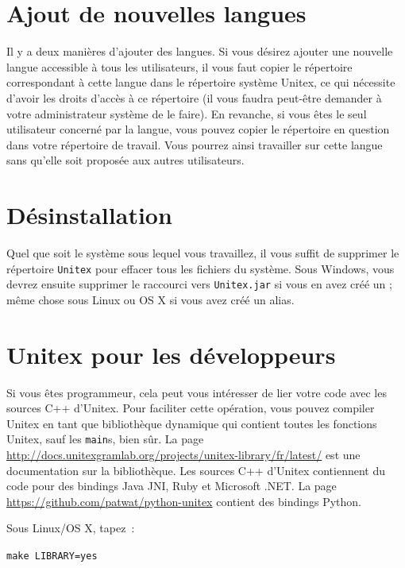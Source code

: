 \section{Ajout de nouvelles langues}

\bigskip
\noindent Il y a deux manières d’ajouter des langues. Si vous désirez ajouter une nouvelle langue
accessible à tous les utilisateurs, il vous faut copier le répertoire correspondant à cette langue
dans le répertoire système Unitex,
ce qui nécessite d’avoir les droits d’accès à ce répertoire
(il vous faudra peut-être demander à votre administrateur système de le faire).
En revanche, si vous êtes le seul utilisateur concerné par la langue, vous pouvez copier le répertoire
en question dans votre répertoire de travail.
Vous pourrez ainsi travailler sur cette langue sans qu’elle soit proposée aux autres utilisateurs.



\section{Désinstallation}
Quel que soit le système sous lequel vous travaillez, il vous suffit de supprimer le répertoire
\verb+Unitex+ pour effacer tous les fichiers du système. Sous Windows, vous devrez ensuite supprimer
le raccourci vers \verb+Unitex.jar+  si vous en avez créé un ;
même chose sous Linux ou OS X si vous avez créé un alias.


\section{Unitex pour les développeurs}
\label{section-unitex-developers}
Si vous êtes programmeur, cela peut vous intéresser de lier votre code avec les sources C++
d'Unitex. Pour faciliter cette opération, vous pouvez compiler Unitex en tant que bibliothèque
dynamique qui contient toutes les fonctions Unitex, sauf les \verb+main+s, bien sûr. La
page \url{http://docs.unitexgramlab.org/projects/unitex-library/fr/latest/} est une documentation sur la bibliothèque.
Les sources C++ d'Unitex contiennent du code pour des bindings Java JNI, Ruby et Microsoft .NET. La
page \url{https://github.com/patwat/python-unitex} contient des bindings Python.


\bigskip
Sous Linux/OS X, tapez~:

\bigskip
\verb+make LIBRARY=yes+

